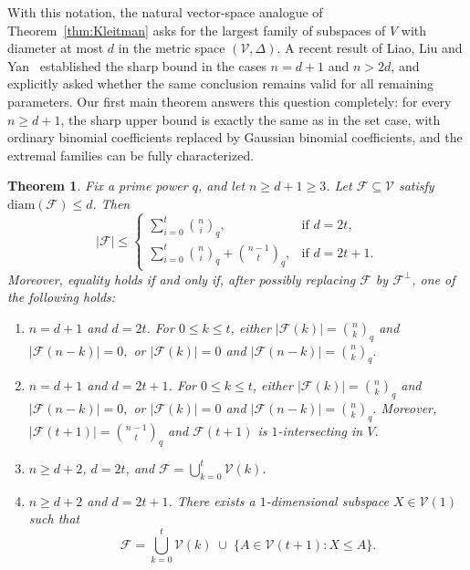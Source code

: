 \documentclass[11pt]{article}
\newtheorem{theorem}{Theorem}[section]
\theoremstyle{definition}
\newcommand{\qbinom}[2]{\genfrac{(}{)}{0pt}{}{#1}{#2}_q}
\newcommand{\diam}{\mathrm{diam}}
\begin{document}
With this notation, the natural vector-space analogue of Theorem~\ref{thm:Kleitman} asks for the largest family of subspaces of $V$ with diameter at most $d$ in the metric space $(\mathcal{V}, \Delta)$. A recent result of Liao, Liu and Yan~\cite{LLY2026} established the sharp bound in the cases $n=d+1$ and $n>2d$, and explicitly asked whether the same conclusion remains valid for all remaining parameters. Our first main theorem answers this question completely: for every $n\ge d+1$, the sharp upper bound is exactly the same as in the set case, with ordinary binomial coefficients replaced by Gaussian binomial coefficients, and the extremal families can be fully characterized.


\begin{theorem}\label{thm:main}
Fix a prime power $q$, and let $n\ge d+1\ge 3$.
Let $\mathcal F\subseteq \mathcal V$ satisfy $\diam(\mathcal F)\le d$.
Then
\[
|\mathcal F|\le
\begin{cases}
\displaystyle \sum_{i=0}^{t}\qbinom{n}{i}, & \text{if } d=2t,\\[2mm]
\displaystyle \sum_{i=0}^{t}\qbinom{n}{i}+\qbinom{n-1}{t}, & \text{if } d=2t+1.
\end{cases}
\]
Moreover, equality holds if and only if, after possibly replacing $\mathcal F$ by $\mathcal F^\perp$, one of the following holds:
\begin{enumerate}
\item[\textup{(1)}] $n=d+1$ and $d=2t$.
For $0\le k\le t$, either
\(
|\mathcal F(k)|=\qbinom{n}{k}\)
and
\(|\mathcal F(n-k)|=0,
\)
or
\(
|\mathcal F(k)|=0\) and
\(
|\mathcal F(n-k)|=\qbinom{n}{k}.
\)

\item[\textup{(2)}] $n=d+1$ and $d=2t+1$.
For $0\le k\le t$, either
\(
|\mathcal F(k)|=\qbinom{n}{k}\)
and \(
|\mathcal F(n-k)|=0,
\)
or
\(
|\mathcal F(k)|=0\)
and \(
|\mathcal F(n-k)|=\qbinom{n}{k}.
\)
Moreover,
\(
|\mathcal F(t+1)|=\qbinom{n-1}{t}
\)
and $\mathcal F(t+1)$ is $1$-intersecting in $V$.

\item[\textup{(3)}] $n\ge d+2$, $d=2t$, and 
\(
\mathcal F=\bigcup_{k=0}^{t}\mathcal V(k).
\)

\item[\textup{(4)}] $n\ge d+2$ and $d=2t+1$.
There exists a $1$-dimensional subspace $X\in\mathcal V(1)$ such that
\[
\mathcal F
=
\bigcup_{k=0}^{t}\mathcal V(k)
\;\cup\;
\{A\in \mathcal V(t+1): X\le A\}.
\]
\end{enumerate}
\end{theorem}
\end{document}
